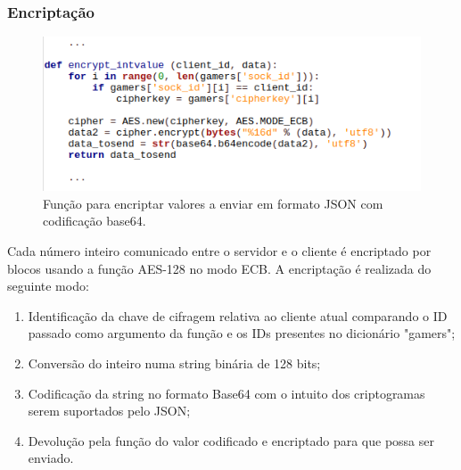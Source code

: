 \documentclass{report}
\begin{document}
\subsubsection{Encriptação}
\begin{figure}[H]
        \centering
        \includegraphics[scale=0.65]{encrypt_intvalue}  
        \caption{Função para encriptar valores a enviar em formato JSON com codificação base64.}
\end{figure}

Cada número inteiro comunicado entre o servidor e o cliente é encriptado por blocos usando a função AES-128 no modo ECB. A encriptação é realizada do seguinte modo: 
\begin{enumerate}
\item Identificação da chave de cifragem relativa ao cliente atual comparando o ID passado como argumento da função e os IDs presentes no dicionário "gamers";
\item Conversão do inteiro numa string binária de 128 bits;
\item Codificação da string no formato Base64 com o intuito dos criptogramas serem suportados pelo JSON;
\item Devolução pela função do valor codificado e encriptado para que possa ser enviado. 
\end{enumerate}
\end{document}
